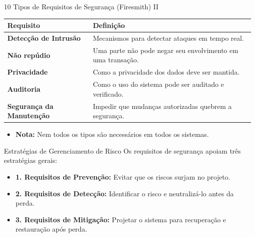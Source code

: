 \documentclass[aspectratio=169]{beamer}
\begin{document}
\begin{frame}{10 Tipos de Requisitos de Segurança (Firesmith) II}
    \centering
    \scriptsize
    \begin{tabular}{lp{10cm}}
        \hline
        \textbf{Requisito} & \textbf{Definição} \\
        \hline
        \textbf{Detecção de Intrusão} & Mecanismos para detectar ataques em tempo real. \\
        \textbf{Não repúdio} & Uma parte não pode negar seu envolvimento em uma transação. \\
        \textbf{Privacidade} & Como a privacidade dos dados deve ser mantida. \\
        \textbf{Auditoria} & Como o uso do sistema pode ser auditado e verificado. \\
        \textbf{Segurança da Manutenção} & Impedir que mudanças autorizadas quebrem a segurança. \\
        \hline
    \end{tabular}
    \vspace{0.3cm}
    \begin{itemize}
        \item \textbf{Nota:} Nem todos os tipos são necessários em todos os sistemas.
    \end{itemize}
\end{frame}

\begin{frame}{Estratégias de Gerenciamento de Risco}
    Os requisitos de segurança apoiam três estratégias gerais:
    \begin{itemize}
        \item \textbf{1. Requisitos de Prevenção:} Evitar que os riscos surjam no projeto.
        \item \textbf{2. Requisitos de Detecção:} Identificar o risco e neutralizá-lo antes da perda.
        \item \textbf{3. Requisitos de Mitigação:} Projetar o sistema para recuperação e restauração após perda.
    \end{itemize}
    \centering
\end{frame}
\end{document}
